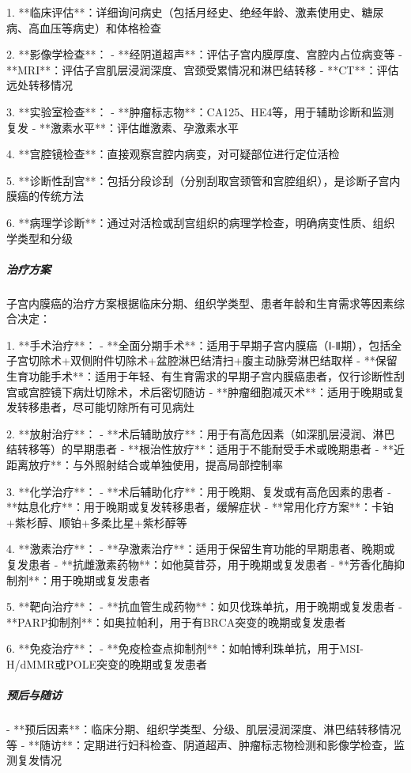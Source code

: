 \begin{enumerate}
1. **临床评估**：详细询问病史（包括月经史、绝经年龄、激素使用史、糖尿病、高血压等病史）和体格检查

2. **影像学检查**：
   - **经阴道超声**：评估子宫内膜厚度、宫腔内占位病变等
   - **MRI**：评估子宫肌层浸润深度、宫颈受累情况和淋巴结转移
   - **CT**：评估远处转移情况

3. **实验室检查**：
   - **肿瘤标志物**：CA125、HE4等，用于辅助诊断和监测复发
   - **激素水平**：评估雌激素、孕激素水平

4. **宫腔镜检查**：直接观察宫腔内病变，对可疑部位进行定位活检

5. **诊断性刮宫**：包括分段诊刮（分别刮取宫颈管和宫腔组织），是诊断子宫内膜癌的传统方法

6. **病理学诊断**：通过对活检或刮宫组织的病理学检查，明确病变性质、组织学类型和分级

\subparagraph{治疗方案}

子宫内膜癌的治疗方案根据临床分期、组织学类型、患者年龄和生育需求等因素综合决定：

1. **手术治疗**：
   - **全面分期手术**：适用于早期子宫内膜癌（Ⅰ-Ⅱ期），包括全子宫切除术+双侧附件切除术+盆腔淋巴结清扫+腹主动脉旁淋巴结取样
   - **保留生育功能手术**：适用于年轻、有生育需求的早期子宫内膜癌患者，仅行诊断性刮宫或宫腔镜下病灶切除术，术后密切随访
   - **肿瘤细胞减灭术**：适用于晚期或复发转移患者，尽可能切除所有可见病灶

2. **放射治疗**：
   - **术后辅助放疗**：用于有高危因素（如深肌层浸润、淋巴结转移等）的早期患者
   - **根治性放疗**：适用于不能耐受手术或晚期患者
   - **近距离放疗**：与外照射结合或单独使用，提高局部控制率

3. **化学治疗**：
   - **术后辅助化疗**：用于晚期、复发或有高危因素的患者
   - **姑息化疗**：用于晚期或复发转移患者，缓解症状
   - **常用化疗方案**：卡铂+紫杉醇、顺铂+多柔比星+紫杉醇等

4. **激素治疗**：
   - **孕激素治疗**：适用于保留生育功能的早期患者、晚期或复发患者
   - **抗雌激素药物**：如他莫昔芬，用于晚期或复发患者
   - **芳香化酶抑制剂**：用于晚期或复发患者

5. **靶向治疗**：
   - **抗血管生成药物**：如贝伐珠单抗，用于晚期或复发患者
   - **PARP抑制剂**：如奥拉帕利，用于有BRCA突变的晚期或复发患者

6. **免疫治疗**：
   - **免疫检查点抑制剂**：如帕博利珠单抗，用于MSI-H/dMMR或POLE突变的晚期或复发患者

\subparagraph{预后与随访}

- **预后因素**：临床分期、组织学类型、分级、肌层浸润深度、淋巴结转移情况等
- **随访**：定期进行妇科检查、阴道超声、肿瘤标志物检测和影像学检查，监测复发情况


\end{enumerate}
